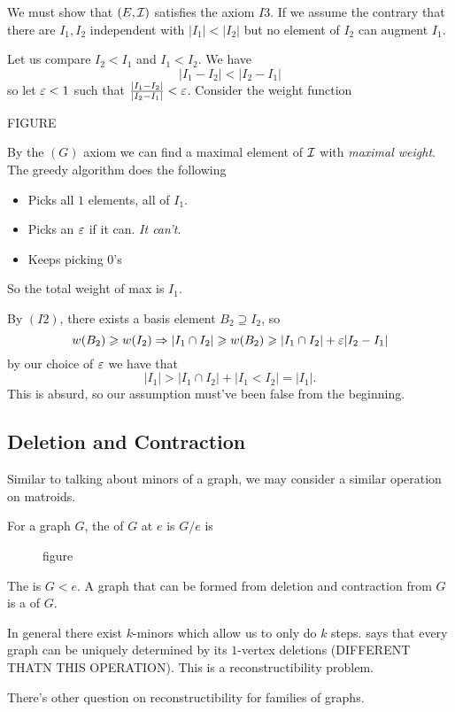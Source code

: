 \documentclass[12pt]{memoir}
\begin{document}
\begin{ptcbp}
    We must show that $(E,\mathcal{I})$ satisfies the axiom $I3$. If we assume the contrary that there are $I_1, I_2$ independent with $|I_1|<|I_2|$ but no element of $I_2$ can augment $I_1$.\par 
    Let us compare $I_2\less I_1$ and $I_1\less I_2$. We have 
    $$|I_1-I_2|<|I_2-I_1|$$
    so let $\varepsilon<1$ such that $\frac{|I_1-I_2|}{|I_2-I_1|}<\varepsilon$.
    Consider the weight function 
    \begin{center}
        FIGURE
    \end{center}
    By the $(G)$ axiom we can find a maximal element of $\mathcal{I}$ with \emph{maximal weight}. The greedy algorithm does the following
    \begin{itemize}
        \item Picks all $1$ elements, all of $I_1$. 
        \item Picks an $\varepsilon$ if it can. \emph{It can't}.
        \item Keeps picking $0$'s
    \end{itemize}
    So the total weight of max is $I_1$.\par 
    By $(I2)$, there exists a basis element $B_2\supseteq I_2$, so 
    $$w(B_2)\geqslant w(I_2)\Rightarrow |I_1\cap I_2|\geqslant w(B_2)\geqslant |I_1\cap I_2|+\varepsilon|I_2-I_1|$$
    by our choice of $\varepsilon$ we have that 
    $$|I_1|>|I_1\cap I_2|+|I_1\less I_2|=|I_1|.$$
    This is absurd, so our assumption must've been false from the beginning. 
\end{ptcbp}

\subsection{Deletion and Contraction}

Similar to talking about minors of a graph, we may consider a similar operation on matroids. 

\begin{Def}
    For a graph $G$, the  of $G$ at $e$ is $G/e$ is 
    \begin{figure}
        figure
    \end{figure}
    The  is $G\less e$. A graph that can be formed from deletion and contraction from $G$ is a  of $G$.
\end{Def}

In general there exist $k$-minors which allow us to only do $k$ steps.  says that every graph can be uniquely determined by its $1$-vertex deletions (DIFFERENT THATN THIS OPERATION). This is a reconstructibility problem.\par 
There's other question on reconstructibility for families of graphs. 
\end{document}
